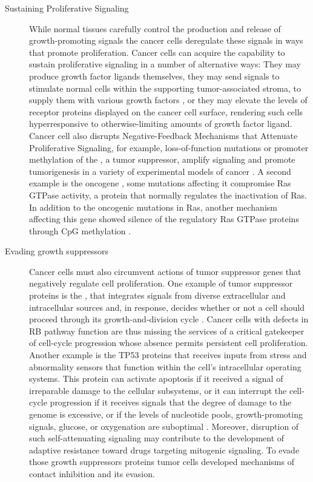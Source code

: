 \begin{description}
  \item [Sustaining Proliferative Signaling]
  While normal tissues carefully control the production and release of growth-promoting
  signals the cancer cells deregulate these signals in ways that promote proliferation.
    Cancer cells can acquire the capability to sustain proliferative signaling in a number of alternative ways: They may produce growth factor ligands themselves, they may send signals to stimulate normal cells within the supporting tumor-associated stroma, to supply them with various growth factors \cite{cheng2008transforming}, or
   they may elevate the levels of receptor proteins displayed on the cancer cell surface,
   rendering such cells hyperresponsive to otherwise-limiting amounts of growth factor ligand.
   Cancer cell also disrupts Negative-Feedback Mechanisms that Attenuate Proliferative Signaling,
   for example,  loss-of-function mutations or promoter methylation of the , a tumor suppressor, amplify  signaling and promote tumorigenesis in a variety of experimental models of cancer \cite{jiang2009pi3k}. A second example is the oncogene , some mutations affecting it compromise Ras GTPase activity,  a protein that normally regulates the inactivation of Ras. In addition to the oncogenic mutations in Ras, another mechanism affecting this gene showed silence of the regulatory Ras GTPase proteins through CpG methylation \cite{jin2007epigenetic}.
   \item [Evading growth suppressors]  Cancer cells must also circumvent actions of tumor suppressor genes that negatively regulate cell proliferation. One example of tumor suppressor proteins is the  ,
   that integrates signals from diverse extracellular and intracellular sources and, in response, decides whether or not a cell should proceed through its growth-and-division cycle \cite{burkhart2008cellular}.
   Cancer cells with defects in RB pathway function are thus missing the services of a critical gatekeeper of cell-cycle progression whose absence permits persistent cell proliferation. Another example is the TP53 proteins that
    receives inputs from stress and abnormality sensors that function within the cell's intracellular operating systems.
    This protein can activate apoptosis if it received a signal of irreparable damage to the cellular subsystems, or it can
    interrupt the cell-cycle progression if it receives signals that the degree of damage to the genome is excessive, or if the levels of nucleotide pools, growth-promoting signals, glucose, or oxygenation are suboptimal \cite{hanahan2011hallmarks}.
    Moreover, disruption of such self-attenuating
    signaling may contribute to the development of
    adaptive resistance toward drugs targeting mitogenic signaling.
    To evade those growth suppressors proteins tumor cells developed mechanisms of contact inhibition and its evasion.


\end{description}

